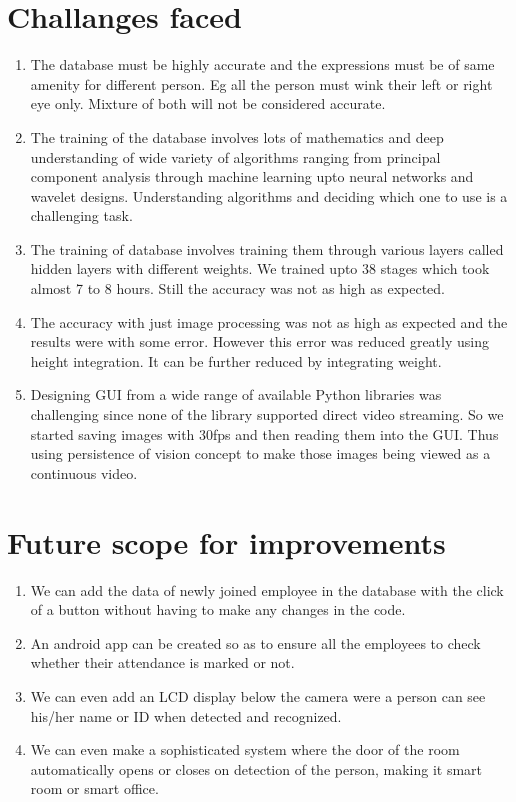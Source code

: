 \documentclass[a4paper,12pt]{article}
\begin{document}
\section{Challanges faced}
\begin{enumerate}
 \item The database must be highly accurate and the expressions must be of same amenity for different person. Eg all the person
   must wink  their left or right eye only. Mixture of both will not be considered accurate.
 \item The training of the database involves lots of mathematics and deep understanding of wide variety of algorithms ranging
   from principal component analysis through machine learning upto neural networks and wavelet designs. Understanding algorithms 
   and deciding which one to use is a challenging task.
 \item The training of database involves training them through various layers called hidden layers with different weights. We trained
   upto 38 stages which took almost 7 to 8 hours. Still the accuracy was not as high as expected.
 \item The accuracy with just image processing was not as high as expected and the results were with some error. However this
   error was reduced greatly using height integration. It can be further reduced by integrating weight.
 \item Designing GUI from a wide range of available Python libraries was challenging since none of the library supported 
   direct video streaming. So we started saving images with 30fps and then reading them into the GUI. Thus using persistence of 
   vision concept to make those images being viewed as a continuous video.
\end{enumerate}

\newpage
\section{Future scope for improvements}
\begin{enumerate}
 \item We can add the data of newly joined employee in the database with the click of a button without having to make any changes
   in the code.
 \item An android app can be created so as to ensure all the employees to check whether their attendance is marked or not.
 \item We can even add an LCD display below the camera were a person can see his/her name or ID when detected and recognized.
 \item We can even make a sophisticated system where the door of the room automatically opens or closes on detection of the person, 
   making it smart room or smart office.
\end{enumerate}
\end{document}

